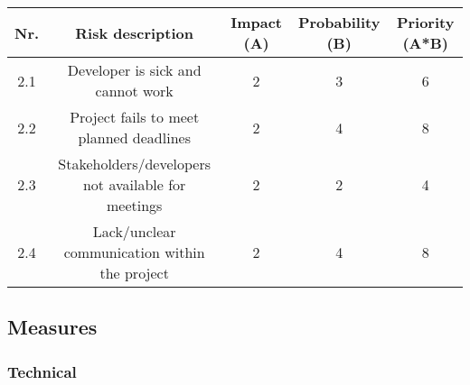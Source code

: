 \documentclass{article} %
\begin{document}
\begin{center}
    \begin{tabular}{|c | c | c | c | c |}
        \hline
        Nr. & Risk description                                   & Impact (A) & Probability (B) & Priority (A*B) \\ [0.5ex]
        \hline\hline
        2.1 & Developer is sick and cannot work                  & 2          & 3               & 6              \\
        \hline
        2.2 & Project fails to meet planned deadlines            & 2          & 4               & 8              \\
        \hline
        2.3 & Stakeholders/developers not available for meetings & 2          & 2               & 4              \\
        \hline
        2.4 & Lack/unclear communication within the project      & 2          & 4               & 8              \\
        \hline
    \end{tabular}
\end{center}

\subsection{Measures}

\subsubsection{Technical}
\end{document}
